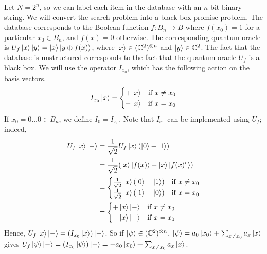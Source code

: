 Let \( N = 2^n \), so we can label each item in the database with an \( n \)-bit binary string.
We will convert the search problem into a black-box promise problem.
The database corresponds to the Boolean function \( f \colon B_n \to B \) where \( f(x_0) = 1 \) for a particular \( x_0 \in B_n \), and \( f(x) = 0 \) otherwise.
The corresponding quantum oracle is \( U_f \ket{x} \ket{y} = \ket{x} \ket{y \oplus f(x)} \), where \( \ket{x} \in (\mathbb C^2)^{\otimes n} \) and \( \ket{y} \in \mathbb C^2 \).
The fact that the database is unstructured corresponds to the fact that the quantum oracle \( U_f \) is a black box.
We will use the operator \( I_{x_0} \), which has the following action on the basis vectors.
\[ I_{x_0} \ket{x} = \begin{cases}
    +\ket{x} & \text{if } x \neq x_0 \\
    -\ket{x} & \text{if } x = x_0
\end{cases} \]
If \( x_0 = 0\dots 0 \in B_n \), we define \( I_0 = I_{x_0} \).
Note that \( I_{x_0} \) can be implemented using \( U_f \); indeed,
\begin{align*}
    U_f \ket{x} \ket{-} &= \frac{1}{\sqrt{2}} U_f \ket{x} \qty(\ket{0} - \ket{1}) \\
    &= \frac{1}{\sqrt{2}}\qty(\ket{x} \ket{f(x)} - \ket{x} \ket{f(x)^c}) \\
    &= \begin{cases}
        \frac{1}{\sqrt{2}} \ket{x} \qty(\ket{0} - \ket{1}) & \text{if } x \neq x_0 \\
        \frac{1}{\sqrt{2}} \ket{x} \qty(\ket{1} - \ket{0}) & \text{if } x = x_0
    \end{cases} \\
    &= \begin{cases}
        +\ket{x}\ket{-} & \text{if } x \neq x_0 \\
        -\ket{x}\ket{-} & \text{if } x = x_0
    \end{cases}
\end{align*}
Hence, \( U_f \ket{x} \ket{-} = (I_{x_0} \ket{x})\ket{-} \).
So if \( \ket{\psi} \in (\mathbb C^2)^{\otimes n} \), \( \ket{\psi} = a_0 \ket{x_0} + \sum_{x \neq x_0} a_x \ket{x} \) gives \( U_f \ket{\psi}\ket{-} = (I_{x_0} \ket{\psi}) \ket{-} = -a_0 \ket{x_0} + \sum_{x \neq x_0} a_x \ket{x} \).

